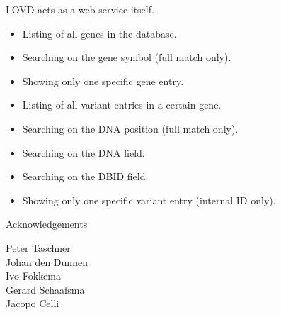 \documentclass[a4, portrait]{seminar}
\begin{document}
\begin{slide}
LOVD acts as a web service itself.

\vspace*{1cm}
\begin{itemize}
\item Listing of all genes in the database.
\item Searching on the gene symbol (full match only).
\item Showing only one specific gene entry.
\item Listing of all variant entries in a certain gene.
\item Searching on the DNA position (full match only).
\item Searching on the DNA field.
\item Searching on the DBID field.
\item Showing only one specific variant entry (internal ID only).
\end{itemize}
\vfill
\end{slide}

\begin{slide}
\begin{center}
Acknowledgements

\vspace*{1cm}
Peter Taschner\\
Johan den Dunnen\\
Ivo Fokkema\\
Gerard Schaafsma\\
Jacopo Celli\\
\end{center}
\vfill
\label{LastPage}
\end{slide}
\end{document}
